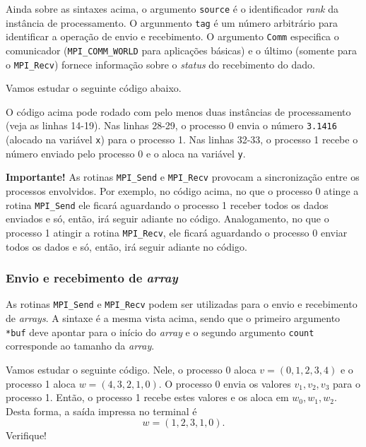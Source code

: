 Ainda sobre as sintaxes acima, o argumento \verb+source+ é o identificador {\it rank} da instância de processamento. O argunmento \verb+tag+ é um número arbitrário para identificar a operação de envio e recebimento. O argumento \verb+Comm+ especifica o comunicador (\verb+MPI_COMM_WORLD+ para aplicações básicas) e o último (somente para o \verb+MPI_Recv+) fornece informação sobre o {\it status} do recebimento do dado.

Vamos estudar o seguinte código abaixo.



O código acima pode rodado com pelo menos duas instâncias de processamento (veja as linhas 14-19). Nas linhas 28-29, o processo 0 envia o número \verb+3.1416+ (alocado na variável \verb+x+) para o processo 1. Nas linhas 32-33, o processo 1 recebe o número enviado pelo processo 0 e o aloca na variável \verb+y+.

{\bf Importante!} As rotinas \verb+MPI_Send+ e \verb+MPI_Recv+ provocam a sincronização entre os processos envolvidos. Por exemplo, no código acima, no que o processo 0 atinge a rotina \verb+MPI_Send+ ele ficará aguardando o processo 1 receber todos os dados enviados e só, então, irá seguir adiante no código. Analogamento, no que o processo 1 atingir a rotina \verb+MPI_Recv+, ele ficará aguardando o processo 0 enviar todos os dados e só, então, irá seguir adiante no código.

\subsubsection{Envio e recebimento de {\it array}}

As rotinas \verb+MPI_Send+ e \verb+MPI_Recv+ podem ser utilizadas para o envio e recebimento de {\it arrays}. A sintaxe é a mesma vista acima, sendo que o primeiro argumento \verb+*buf+ deve apontar para o início do {\it array} e o segundo argumento \verb+count+ corresponde ao tamanho da {\it array}.

Vamos estudar o seguinte código. Nele, o processo 0 aloca $v = (0,1,2,3,4)$ e o processo 1 aloca $w = (4,3,2,1,0)$. O processo 0 envia os valores $v_1, v_2, v_3$ para o processo 1. Então, o processo 1 recebe estes valores e os aloca em $w_0, w_1, w_2$. Desta forma, a saída impressa no terminal é
\begin{equation}
  w = (1, 2, 3, 1, 0).
\end{equation}
Verifique!

